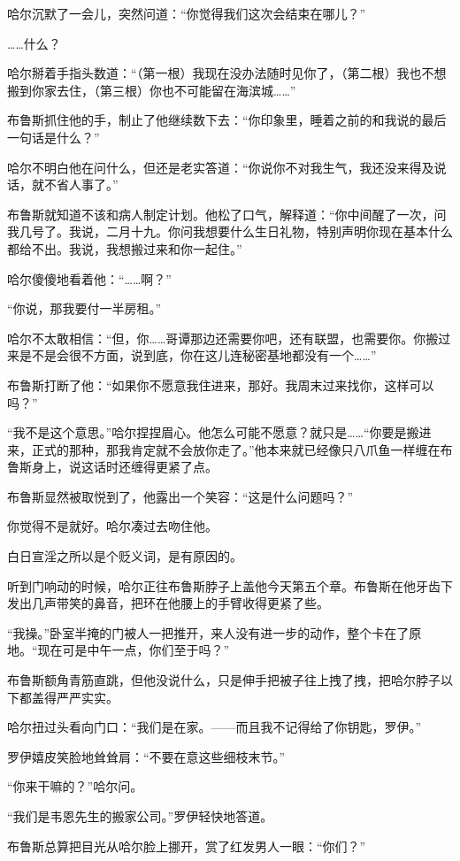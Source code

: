\documentclass[../main]{subfiles}
\begin{document}
哈尔沉默了一会儿，突然问道：“你觉得我们这次会结束在哪儿？”

……什么？

哈尔掰着手指头数道：“（第一根）我现在没办法随时见你了，（第二根）我也不想搬到你家去住，（第三根）你也不可能留在海滨城\ldots\ldots”

布鲁斯抓住他的手，制止了他继续数下去：“你印象里，睡着之前的和我说的最后一句话是什么？”

哈尔不明白他在问什么，但还是老实答道：“你说你不对我生气，我还没来得及说话，就不省人事了。”

布鲁斯就知道不该和病人制定计划。他松了口气，解释道：“你中间醒了一次，问我几号了。我说，二月十九。你问我想要什么生日礼物，特别声明你现在基本什么都给不出。我说，我想搬过来和你一起住。”

哈尔傻傻地看着他：“……啊？”

“你说，那我要付一半房租。”

哈尔不太敢相信：“但，你……哥谭那边还需要你吧，还有联盟，也需要你。你搬过来是不是会很不方面，说到底，你在这儿连秘密基地都没有一个\ldots\ldots”

布鲁斯打断了他：“如果你不愿意我住进来，那好。我周末过来找你，这样可以吗？”

“我不是这个意思。”哈尔捏捏眉心。他怎么可能不愿意？就只是\ldots\ldots“你要是搬进来，正式的那种，那我肯定就不会放你走了。”他本来就已经像只八爪鱼一样缠在布鲁斯身上，说这话时还缠得更紧了点。

布鲁斯显然被取悦到了，他露出一个笑容：“这是什么问题吗？”

你觉得不是就好。哈尔凑过去吻住他。

白日宣淫之所以是个贬义词，是有原因的。

听到门响动的时候，哈尔正往布鲁斯脖子上盖他今天第五个章。布鲁斯在他牙齿下发出几声带笑的鼻音，把环在他腰上的手臂收得更紧了些。

“我操。”卧室半掩的门被人一把推开，来人没有进一步的动作，整个卡在了原地。“现在可是中午一点，你们至于吗？”

布鲁斯额角青筋直跳，但他没说什么，只是伸手把被子往上拽了拽，把哈尔脖子以下都盖得严严实实。

哈尔扭过头看向门口：“我们是在家。——而且我不记得给了你钥匙，罗伊。”

罗伊嬉皮笑脸地耸耸肩：“不要在意这些细枝末节。”

“你来干嘛的？”哈尔问。

“我们是韦恩先生的搬家公司。”罗伊轻快地答道。

布鲁斯总算把目光从哈尔脸上挪开，赏了红发男人一眼：“你们？”
\end{document}
